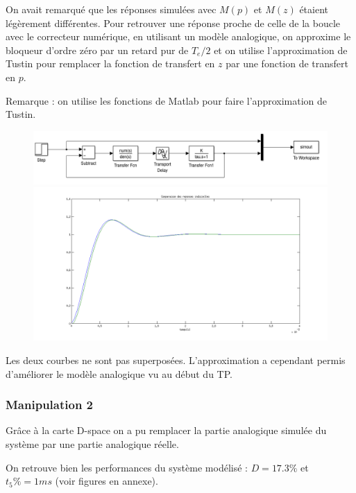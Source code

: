 \documentclass[../../Cours_M1.tex]{subfiles}
\begin{document}
On avait remarqué que les réponses simulées avec $M(p)$ et $M(z)$ étaient légèrement différentes. Pour retrouver une réponse proche de celle de la boucle avec le correcteur numérique, en utilisant un modèle analogique, on approxime le bloqueur d'ordre zéro par un retard pur de $T_e/2$ et on utilise l'approximation de Tustin pour remplacer la fonction de transfert en $z$ par une fonction de transfert en $p$.

\noindent Remarque : on utilise les fonctions de Matlab pour faire l'approximation de Tustin.\\

\begin{figure}[h!]
\centering
\includegraphics[scale=0.4]{tustin.png}
\includegraphics[scale=0.4]{simtustin.png}
\end{figure}

Les deux courbes ne sont pas superposées. L'approximation a cependant permis d'améliorer le modèle analogique vu au début du TP.

\subsubsection*{Manipulation 2}

Grâce à la carte D-space on a pu remplacer la partie analogique simulée du système par une partie analogique réelle. 

On retrouve bien les performances du système modélisé : $D = 17.3 \%$ et $t_5\% = 1 ms$ (voir figures en annexe).
\end{document}
